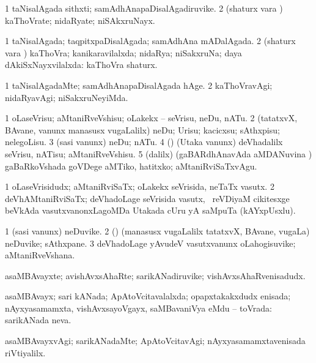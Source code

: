\bentry
{}
\gl{\nA}
\bmng
\bnum
\num{1} taNisalAgada sithxti; samAdhAnapaDisalAgadiruvike. 
\num{2} (shaturx \mo vara \vi) kaThoVrate; nidaRyate; niSAkxruNayx. 
\enum
\emng
\eentry

\bentry
{}
\gl{\gu}
\bmng
\bnum
\num{1} taNisalAgada; taqpitxpaDisalAgada; samAdhAna mADalAgada. 
\num{2} (shaturx \mo vara \vi) kaThoVra; kanikaravilalxda; nidaRya; niSakxruNa; daya dAkiSxNayxvilalxda:  kaThoVra shaturx. 
\enum
\emng
\eentry

\bentry
{}
\gl{\kirxvi}
\bmng
\bnum
\num{1} taNisalAgadaMte; samAdhAnapaDisalAgada hAge. 
\num{2} kaThoVravAgi; nidaRyavAgi; niSakxruNeyiMda. 
\enum
\emng
\eentry

\bentry
{}
\gl{\sakirx}
\bmng
\bnum
\num{1} oLaseVrisu; aMtaniRveVshisu; oLakekx -- seVrisu, neDu, nATu. 
\num{2} (tatatxvX, BAvane, \mo vanunx manasusx \mo vugaLalilx) neDu; Urisu; kacicxsu; sAthxpisu; nelegoLisu. 
\num{3} (sasi \mo vanunx) neDu; nATu. 
\num{4} (\veYshA) (Utaka \mo vanunx) deVhadalilx seVrisu, nATisu; aMtaniRveVshisu. 
\num{5} (\kaparx dalilx) (gaBARdhAnavAda aMDANuvina \vi) gaBaRkoVshada goVDege aMTiko, hatitxko; aMtaniRviSaTxvAgu. 
\enum
\emng
\eentry

\bentry
{}
\gl{\nA}
\bmng
\bnum
\num{1} oLaseVrisidudx; aMtaniRviSaTx; oLakekx seVrisida, neTaTx vasutx. 
\num{2} deVhAMtaniRviSaTx; deVhadoLage seVrisida vasutx, \kanmu\ reVDiyaM cikitesxge beVkAda vasutxvanonxLagoMDa Utakada cUru yA saMpuTa (kAYxpUsxlu). 
\enum
\emng
\eentry

\bentry
{}
\gl{\nA}
\bmng
\bnum
\num{1} (sasi \mo vanunx) neDuvike. 
\num{2} (\rUpa) (manasusx \mo vugaLalilx tatatxvX, BAvane, \mo vugaLa) neDuvike; sAthxpane. 
\num{3} deVhadoLage yAvudeV vasutxvanunx oLahogisuvike; aMtaniRveVshana. 
\enum
\emng
\eentry

\bentry
{}
\gl{\nA}
\bmng
asaMBAvayxte; avishAvxsAhaRte; sarikANadiruvike; vishAvxsAhaRvenisadudx. 
\emng
\eentry

\bentry
{}
\gl{\gu}
\bmng
asaMBAvayx; sari kANada; ApAtoVcitavalalxda; opapxtakakxdudx enisada; nAyxyasamamxta, vishAvxsayoVgayx, saMBavaniVya eMdu -- toVrada:  sarikANada neva. 
\emng
\eentry

\bentry
{}
\gl{\kirxvi}
\bmng
asaMBAvayxvAgi; sarikANadaMte; ApAtoVcitavAgi; nAyxyasamamxtavenisada riVtiyalilx. 
\emng
\eentry

